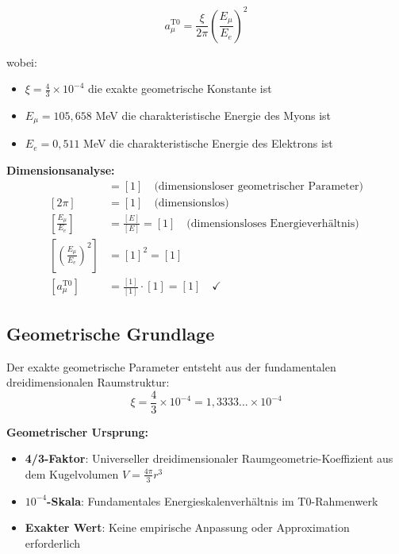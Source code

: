 \documentclass[12pt,a4paper]{report}
\begin{document}
	\begin{equation}
		\boxed{a_\mu^{\text{T0}} = \frac{\xi}{2\pi} \left(\frac{E_\mu}{E_e}\right)^2}
		\label{eq:t0_muon_formula}
	\end{equation}
	
	wobei:
	\begin{itemize}
		\item $\xi = \frac{4}{3} \times 10^{-4}$ die exakte geometrische Konstante ist
		\item $E_\mu = 105,658$ MeV die charakteristische Energie des Myons ist
		\item $E_e = 0,511$ MeV die charakteristische Energie des Elektrons ist
	\end{itemize}
	
	\textbf{Dimensionsanalyse:}
	\begin{align}
		[\xi] &= [1] \quad \text{(dimensionsloser geometrischer Parameter)} \\
		[2\pi] &= [1] \quad \text{(dimensionslos)} \\
		\left[\frac{E_\mu}{E_e}\right] &= \frac{[E]}{[E]} = [1] \quad \text{(dimensionsloses Energieverhältnis)} \\
		\left[\left(\frac{E_\mu}{E_e}\right)^2\right] &= [1]^2 = [1] \\
		[a_\mu^{\text{T0}}] &= \frac{[1]}{[1]} \cdot [1] = [1] \quad \checkmark
	\end{align}
	
	\subsection{Geometrische Grundlage}
	\label{subsec:geometric_foundation}
	
	Der exakte geometrische Parameter entsteht aus der fundamentalen dreidimensionalen Raumstruktur:
	\begin{equation}
		\xi = \frac{4}{3} \times 10^{-4} = 1,3333... \times 10^{-4}
	\end{equation}
	
	\textbf{Geometrischer Ursprung:}
	\begin{itemize}
		\item \textbf{4/3-Faktor}: Universeller dreidimensionaler Raumgeometrie-Koeffizient aus dem Kugelvolumen $V = \frac{4\pi}{3}r^3$
		\item \textbf{$10^{-4}$-Skala}: Fundamentales Energieskalenverhältnis im T0-Rahmenwerk
		\item \textbf{Exakter Wert}: Keine empirische Anpassung oder Approximation erforderlich
	\end{itemize}
	
\end{document}
